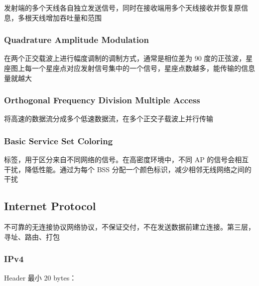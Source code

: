 \documentclass[11pt,journal,compsoc]{IEEEtran}
\begin{document}
发射端的多个天线各自独立发送信号，同时在接收端用多个天线接收并恢复原信息，多根天线增加吞吐量和范围


\subsubsection{Quadrature Amplitude Modulation}

在两个正交载波上进行幅度调制的调制方式，通常是相位差为 90 度的正弦波，星座图上每一个星座点对应发射信号集中的一个信号，星座点数越多，能传输的信息量就越大


\subsubsection{Orthogonal Frequency Division Multiple Access}

将高速的数据流分成多个低速数据流，在多个正交子载波上并行传输


\subsubsection{Basic Service Set Coloring}

标签，用于区分来自不同网络的信号。在高密度环境中，不同 AP 的信号会相互干扰，降低性能。通过为每个 BSS 分配一个颜色标识，减少相邻无线网络之间的干扰


\subsection{Internet Protocol}

不可靠的无连接协议网络协议，不保证交付，不在发送数据前建立连接。第三层，寻址、路由、打包


\subsubsection{IPv4}

Header 最小 20 bytes：
\end{document}
